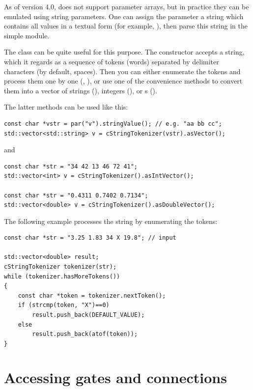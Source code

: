 As of version 4.0, {\opp} does not support parameter arrays,
but in practice they can be emulated using string parameters.
One can assign the parameter a string which contains all values
in a textual form (for example, ), then
parse this string in the simple module.

The  class can be quite useful for this
purpose. The constructor accepts a string, which it regards as
a sequence of tokens (words) separated by delimiter characters
(by default, spaces). Then you can either enumerate the tokens
and process them one by one (, ),
or use one of the  convenience methods to convert
them into a vector of strings (), integers (),
or s ().

The latter methods can be used like this:

\begin{verbatim}
const char *vstr = par("v").stringValue(); // e.g. "aa bb cc";
std::vector<std::string> v = cStringTokenizer(vstr).asVector();
\end{verbatim}

and

\begin{verbatim}
const char *str = "34 42 13 46 72 41";
std::vector<int> v = cStringTokenizer().asIntVector();

const char *str = "0.4311 0.7402 0.7134";
std::vector<double> v = cStringTokenizer().asDoubleVector();
\end{verbatim}

The following example processes the string by enumerating the tokens:

\begin{verbatim}
const char *str = "3.25 1.83 34 X 19.8"; // input

std::vector<double> result;
cStringTokenizer tokenizer(str);
while (tokenizer.hasMoreTokens())
{
    const char *token = tokenizer.nextToken();
    if (strcmp(token, "X")==0)
        result.push_back(DEFAULT_VALUE);
    else
        result.push_back(atof(token));
}
\end{verbatim}



\section{Accessing gates and connections}
\label{sec:simple-modules:gates}

